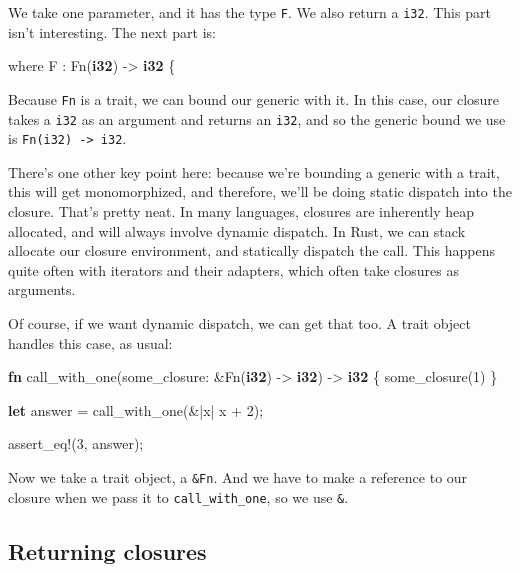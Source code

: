 \documentclass[a4paper,]{book}
\newenvironment{Shaded}{\begin{snugshade}}{\end{snugshade}}
\newcommand{\KeywordTok}[1]{\textcolor[rgb]{0.13,0.29,0.53}{\textbf{{#1}}}}
\newcommand{\DecValTok}[1]{\textcolor[rgb]{0.00,0.00,0.81}{{#1}}}
\newcommand{\OtherTok}[1]{\textcolor[rgb]{0.56,0.35,0.01}{{#1}}}
\newcommand{\NormalTok}[1]{{#1}}
\begin{document}
We take one parameter, and it has the type \texttt{F}. We also return a
\texttt{i32}. This part isn't interesting. The next part is:

\begin{Shaded}
\begin{Highlighting}[]
    \NormalTok{where F : Fn(}\KeywordTok{i32}\NormalTok{) -> }\KeywordTok{i32} \NormalTok{\{}
\end{Highlighting}
\end{Shaded}

Because \texttt{Fn} is a trait, we can bound our generic with it. In
this case, our closure takes a \texttt{i32} as an argument and returns
an \texttt{i32}, and so the generic bound we use is
\texttt{Fn(i32)\ -\textgreater{}\ i32}.

There's one other key point here: because we're bounding a generic with
a trait, this will get monomorphized, and therefore, we'll be doing
static dispatch into the closure. That's pretty neat. In many languages,
closures are inherently heap allocated, and will always involve dynamic
dispatch. In Rust, we can stack allocate our closure environment, and
statically dispatch the call. This happens quite often with iterators
and their adapters, which often take closures as arguments.

Of course, if we want dynamic dispatch, we can get that too. A trait
object handles this case, as usual:

\begin{Shaded}
\begin{Highlighting}[]
\KeywordTok{fn} \NormalTok{call_with_one(some_closure: &Fn(}\KeywordTok{i32}\NormalTok{) -> }\KeywordTok{i32}\NormalTok{) -> }\KeywordTok{i32} \NormalTok{\{}
    \NormalTok{some_closure(}\DecValTok{1}\NormalTok{)}
\NormalTok{\}}

\KeywordTok{let} \NormalTok{answer = call_with_one(&|x| x + }\DecValTok{2}\NormalTok{);}

\OtherTok{assert_eq!}\NormalTok{(}\DecValTok{3}\NormalTok{, answer);}
\end{Highlighting}
\end{Shaded}

Now we take a trait object, a \texttt{\&Fn}. And we have to make a
reference to our closure when we pass it to \texttt{call\_with\_one}, so
we use \texttt{\&\textbar{}\textbar{}}.

\subsection{Returning closures}\label{returning-closures}
\end{document}
